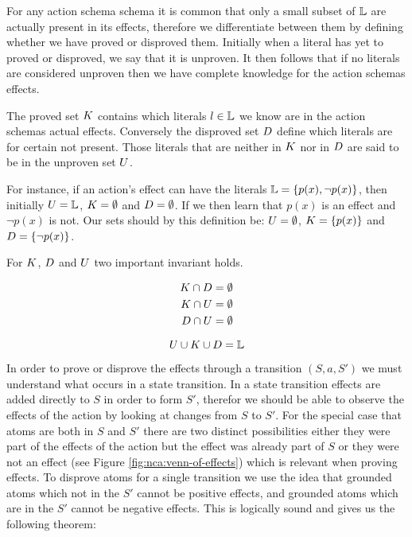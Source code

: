 \documentclass[../Master.tex]{subfiles}
\begin{document}
For any action schema schema it is common that only a small subset of $\mathbb{L}$ are actually present in its effects, 
therefore we differentiate between them by defining whether we have proved or disproved them. 
Initially when a literal has yet to proved or disproved, we say that it is unproven. 
It then follows that if no literals are considered unproven then we have complete knowledge for the action schemas effects.


\begin{definition} 
	The proved set $K$ contains which literals  $l \in \mathbb{L}$ we know are in the action schemas actual effects.
	Conversely the disproved set $D$ define which literals are for certain not present.
	Those literals that are neither in $K$ nor in $D$ are said to be in the unproven set $U$.
	
	For instance, if an action's effect can have the literals $\mathbb{L} = \{p(x), \neg p(x)\}$, 
	then initially $U = \mathbb{L}$, $K = \emptyset$ and $D = \emptyset$. 
	If we then learn that $p(x)$ is an effect and $\neg p(x)$ is not. 
	Our sets should by this definition be: $U = \emptyset$, $K = \{p(x)\}$ and $D = \{\neg p(x)\}$. 
	
\end{definition}

For $K$, $D$ and $U$ two important invariant holds.

\begin{invariant}
	\begin{equation*}
		\begin{split}
		K \cap D & = \emptyset  \\ 
		K \cap U &= \emptyset \\
		D \cap U &= \emptyset
		\end{split}
	\end{equation*}
\end{invariant}

\begin{invariant}[Completeness]
	\begin{equation*}
		U \cup K \cup D = \mathbb{L}
	\end{equation*}
\end{invariant}

In order to prove or disprove the effects through a transition $(S,a,S')$ we must understand what occurs in a state transition.
In a state transition effects are added directly to $S$ in order to form $S'$, therefor we should be able to observe the effects of the action by looking at changes from $S$ to $S'$.  For the special case that atoms are both in $S$ and $S'$ there are two distinct possibilities either they were part of the effects of the action but the effect was already part of $S$ or they were not an effect (see Figure \ref{fig:nca:venn-of-effects}) which is relevant when proving effects. 
To disprove atoms for a single transition we use the idea that grounded atoms which not in the $S'$ cannot be positive effects, and grounded atoms which are in the $S'$ cannot be negative effects. 
This is logically sound and gives us the following theorem:
\end{document}
